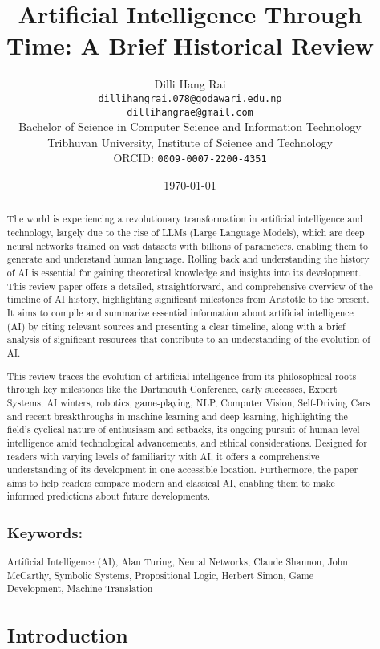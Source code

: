\documentclass[12pt]{article}
\title{Artificial Intelligence Through Time: A Brief Historical Review}
\author{
    Dilli Hang Rai \\
    \texttt{dillihangrai.078@godawari.edu.np} \\
    \texttt{dillihangrae@gmail.com} \\
    Bachelor of Science in Computer Science and Information Technology \\
    Tribhuvan University, Institute of Science and Technology \\
    ORCID: \texttt{0009-0007-2200-4351}
}
\date{\today}
\begin{document}
\maketitle

\begin{abstract}
{

The world is experiencing a revolutionary transformation in artificial intelligence and technology, largely due to the rise of LLMs (Large Language Models), which are deep neural networks trained on vast datasets with billions of parameters, enabling them to generate and understand human language. Rolling back and understanding the history of AI is essential for gaining theoretical knowledge and insights into its development. This review paper offers a detailed, straightforward, and comprehensive overview of the timeline of AI history, highlighting significant milestones from Aristotle to the present. It aims to compile and summarize essential information about artificial intelligence (AI) by citing relevant sources and presenting a clear timeline, along with a brief analysis of significant resources that contribute to an understanding of the evolution of AI.

This review traces the evolution of artificial intelligence from its philosophical roots through key milestones like the Dartmouth Conference, early successes, Expert Systems, AI winters, robotics, game-playing, NLP, Computer Vision, Self-Driving Cars and recent breakthroughs in machine learning and deep learning, highlighting the field's cyclical nature of enthusiasm and setbacks, its ongoing pursuit of human-level intelligence amid technological advancements, and ethical considerations. Designed for readers with varying levels of familiarity with AI, it offers a comprehensive understanding of its development in one accessible location. Furthermore, the paper aims to help readers compare modern and classical AI, enabling them to make informed predictions about future developments.

}
\subsection*{Keywords:} Artificial Intelligence (AI),
Alan Turing,
Neural Networks,
Claude Shannon,
John McCarthy,
Symbolic Systems,
Propositional Logic,
Herbert Simon,
Game Development,
Machine Translation

\section{Introduction}


\end{abstract}
\end{document}
